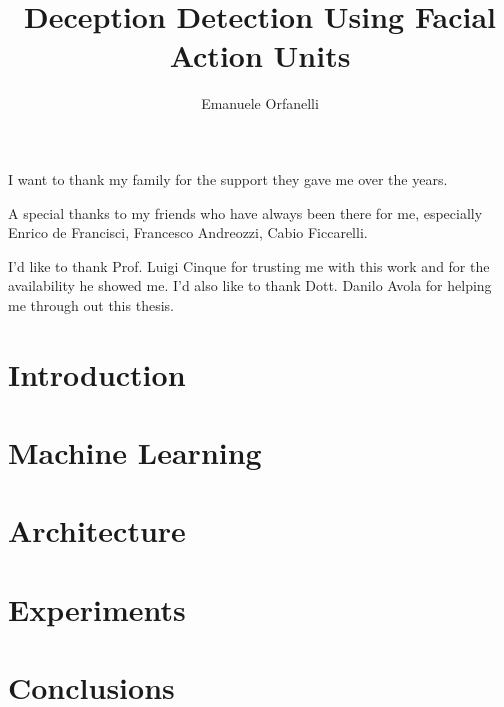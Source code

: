 \documentclass[LaM,binding=0.6cm,english,noexaminfo]{sapthesis}
\title{Deception Detection Using Facial Action Units}
\author{Emanuele Orfanelli}
\begin{document}
\frontmatter

\maketitle

\dedication{Dedicated to\\ my Family and Friends}

\begin{acknowledgments}
I want to thank my family for the support they gave me over the years.

A special thanks to my friends who have always been there for me, especially Enrico de Francisci, Francesco Andreozzi, Cabio Ficcarelli.

I'd like to thank Prof. Luigi Cinque for trusting me with this work and for the availability he showed me. I'd also like to thank Dott. Danilo Avola for helping me through out this thesis. 

\end{acknowledgments}

\tableofcontents



\mainmatter

\chapter{Introduction}


\chapter{Machine Learning}


\chapter{Architecture}


\chapter{Experiments}


\chapter{Conclusions}


\backmatter

\printbibliography

\listoffigures

\cleardoublepage
\end{document}
